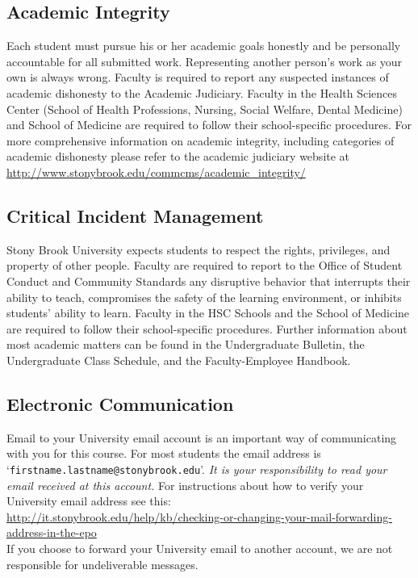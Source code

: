 \documentclass[10pt]{article}
\begin{document}
\subsection*{Academic Integrity}

Each student must pursue his or her academic goals honestly and be
personally accountable for all submitted work. Representing another
person's work as your own is always wrong. Faculty is required to
report any suspected instances of academic dishonesty to the Academic
Judiciary. Faculty in the Health Sciences Center (School of Health
Professions, Nursing, Social Welfare, Dental Medicine) and School of
Medicine are required to follow their school-specific procedures. For
more comprehensive information on academic integrity, including
categories of academic dishonesty please refer to the academic
judiciary website at\\
{\small \url{http://www.stonybrook.edu/commcms/academic\_integrity/}}


\subsection*{Critical Incident Management}

Stony Brook University expects students to respect the rights,
privileges, and property of other people. Faculty are required to
report to the Office of Student Conduct and Community Standards any
disruptive behavior that interrupts their ability to teach,
compromises the safety of the learning environment, or inhibits
students' ability to learn. Faculty in the HSC Schools and the School
of Medicine are required to follow their school-specific
procedures. Further information about most academic matters can be
found in the Undergraduate Bulletin, the Undergraduate Class Schedule,
and the Faculty-Employee Handbook.


\subsection*{Electronic Communication}

Email to your University email account is an important way
of communicating with you for this course.  For most students the
email address is `{\tt firstname.lastname@stonybrook.edu}'.
{\em It is your responsibility to read your email received at this
  account.}  For instructions about how to verify your University
email address see this: \\
{\small \url{http://it.stonybrook.edu/help/kb/checking-or-changing-your-mail-forwarding-address-in-the-epo}}\\
If you choose to forward your University email to another account, we
are not responsible for undeliverable messages.
\end{document}
